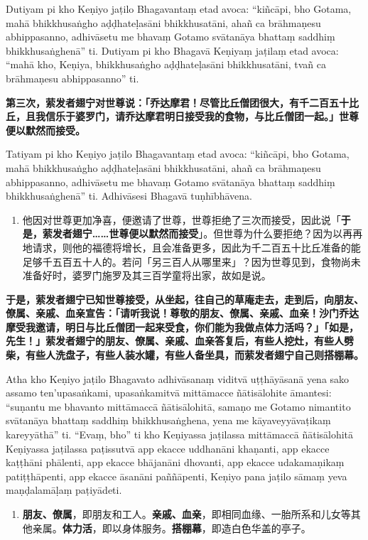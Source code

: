 Dutiyam pi kho Keṇiyo jaṭilo Bhagavantaṃ etad avoca: “kiñcāpi, bho Gotama, mahā bhikkhusaṅgho aḍḍhateḷasāni bhikkhusatāni, ahañ ca brāhmaṇesu abhippasanno, adhivāsetu me bhavaṃ Gotamo svātanāya bhattaṃ saddhiṃ bhikkhusaṅghenā” ti. Dutiyam pi kho Bhagavā Keṇiyaṃ jaṭilaṃ etad avoca: “mahā kho, Keṇiya, bhikkhusaṅgho aḍḍhateḷasāni bhikkhusatāni, tvañ ca brāhmaṇesu abhippasanno” ti.

\textbf{第三次，萦发者翅宁对世尊说：「乔达摩君！尽管比丘僧团很大，有千二百五十比丘，且我信乐于婆罗门，请乔达摩君明日接受我的食物，与比丘僧团一起。」世尊便以默然而接受。}

Tatiyam pi kho Keṇiyo jaṭilo Bhagavantaṃ etad avoca: “kiñcāpi, bho Gotama, mahā bhikkhusaṅgho aḍḍhateḷasāni bhikkhusatāni, ahañ ca brāhmaṇesu abhippasanno, adhivāsetu me bhavaṃ Gotamo svātanāya bhattaṃ saddhiṃ bhikkhusaṅghenā” ti. Adhivāsesi Bhagavā tuṇhībhāvena.

\begin{enumerate}\item 他因对世尊更加净喜，便邀请了世尊，世尊拒绝了三次而接受，因此说「\textbf{于是，萦发者翅宁……世尊便以默然而接受}」。但世尊为什么要拒绝？因为以再再地请求，则他的福德将增长，且会准备更多，因此为千二百五十比丘准备的能足够千五百五十人的。若问「另三百人从哪里来」？因为世尊见到，食物尚未准备好时，婆罗门施罗及其三百学童将出家，故如是说。\end{enumerate}

\textbf{于是，萦发者翅宁已知世尊接受，从坐起，往自己的草庵走去，走到后，向朋友、僚属、亲戚、血亲宣告：「请听我说！尊敬的朋友、僚属、亲戚、血亲！沙门乔达摩受我邀请，明日与比丘僧团一起来受食，你们能为我做点体力活吗？」「如是，先生！」萦发者翅宁的朋友、僚属、亲戚、血亲答复后，有些人挖灶，有些人劈柴，有些人洗盘子，有些人装水罐，有些人备坐具，而萦发者翅宁自己则搭棚幕。}

Atha kho Keṇiyo jaṭilo Bhagavato adhivāsanaṃ viditvā uṭṭhāyāsanā yena sako assamo ten’upasaṅkami, upasaṅkamitvā mittāmacce ñātisālohite āmantesi: “suṇantu me bhavanto mittāmaccā ñātisālohitā, samaṇo me Gotamo nimantito svātanāya bhattaṃ saddhiṃ bhikkhusaṅghena, yena me kāyaveyyāvaṭikaṃ kareyyāthā” ti. “Evaṃ, bho” ti kho Keṇiyassa jaṭilassa mittāmaccā ñātisālohitā Keṇiyassa jaṭilassa paṭissutvā app ekacce uddhanāni khaṇanti, app ekacce kaṭṭhāni phālenti, app ekacce bhājanāni dhovanti, app ekacce udakamaṇikaṃ patiṭṭhāpenti, app ekacce āsanāni paññāpenti, Keṇiyo pana jaṭilo sāmaṃ yeva maṇḍalamāḷaṃ paṭiyādeti.

\begin{enumerate}\item \textbf{朋友、僚属}，即朋友和工人。\textbf{亲戚、血亲}，即相同血缘、一胎所系和儿女等其他亲属。\textbf{体力活}，即以身体服务。\textbf{搭棚幕}，即造白色华盖的亭子。\end{enumerate}

